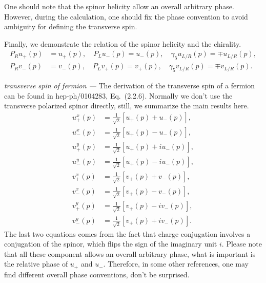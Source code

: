 \documentclass[a4paper,11pt]{article}
\newcommand{\bb}[1]{\left[#1\right]}
\begin{document}
One should note that the spinor helicity allow an overall arbitrary phase. However, during the calculation, one should fix the phase convention to avoid ambiguity for defining the transverse spin.
    

Finally, we demonstrate the relation of the spinor helicity and the chirality.
\begin{align}
    P_R u_+(p) &= u_+(p), \quad P_L u_-(p) = u_-(p), \quad \gamma_5 u_{L/R}(p) = \mp u_{L/R}(p), \\
    P_R v_-(p) &= v_-(p), \quad P_L v_+(p) = v_+(p), \quad \gamma_5 v_{L/R}(p) = \mp v_{L/R}(p).
\end{align}

\emph{transverse spin of fermion ---}
The derivation of the transverse spin of a fermion can be found in hep-ph/0104283, Eq.~(2.2.6). Normally we don't use the transverse polarized spinor directly, still, we summarize the main results here.
\begin{align}
    u^x_+(p) &= \frac{1}{\sqrt{2}}\bb{u_+(p) + u_-(p)}, \\
    u^x_-(p) &= \frac{1}{\sqrt{2}}\bb{u_+(p) - u_-(p)}, \\
    u^y_+(p) &= \frac{1}{\sqrt{2}}\bb{u_+(p) + i u_-(p)}, \\
    u^y_-(p) &= \frac{1}{\sqrt{2}}\bb{u_+(p) - i u_-(p)}, \\
    v^x_+(p) &= \frac{1}{\sqrt{2}}\bb{v_+(p) + v_-(p)}, \\
    v^x_-(p) &= \frac{1}{\sqrt{2}}\bb{v_+(p) - v_-(p)}, \\
    v^y_+(p) &= \frac{1}{\sqrt{2}}\bb{v_+(p) - i v_-(p)}, \\
    v^y_-(p) &= \frac{1}{\sqrt{2}}\bb{v_+(p) + i v_-(p)}.
\end{align}
The last two equations comes from the fact that charge conjugation involves a conjugation of the spinor, which flips the sign of the imaginary unit $i$.
Please note that all these component allows an overall arbitrary phase, what is important is the relative phase of $u_+$ and $u_-$.
Therefore, in some other references, one may find different overall phase conventions, don't be surprised.
\end{document}
